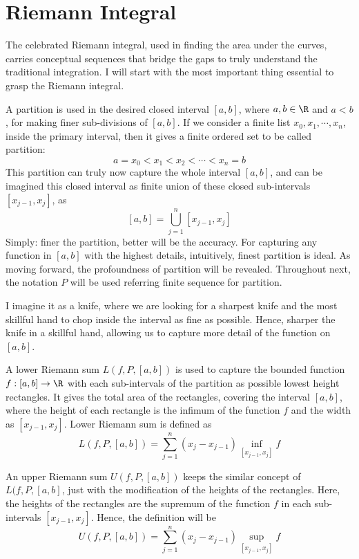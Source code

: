 \section{Riemann Integral}
The celebrated Riemann integral, used in finding the area under the curves, carries conceptual sequences that bridge the gaps to truly understand the traditional integration. I will start with the most important thing essential to grasp the Riemann integral.
\begin{concept}[Partition]
A partition is used in the desired closed interval $[a, b]$, where $a, b\in \R$ and $a<b$, for making finer sub-divisions of $[a, b]$. If we consider a finite list $x_0, x_1,\cdots ,x_n$, inside the primary interval, then it gives a finite ordered set to be called partition:
\[
a=x_0<x_1<x_2<\cdots <x_n=b
\]
This partition can truly now capture the whole interval $[a, b]$, and can be imagined this closed interval as finite union of these closed sub-intervals $[x_{j-1}, x_j]$, as
\[
[a, b] = \bigcup_{j=1}^n [x_{j-1}, x_j]
\]
Simply: finer the partition, better will be the accuracy. 
For capturing any function in $[a,b]$ with the highest details, intuitively, finest partition is ideal. As moving forward, the profoundness of partition will be revealed. Throughout next, the notation $P$ will be used referring finite sequence for partition.
\end{concept}
\begin{analogy}
    I imagine it as a knife, where we are looking for a sharpest knife and the most skillful hand to chop inside the interval as fine as possible. Hence, sharper the knife in a skillful hand, allowing us to capture more detail of the function on $[a, b]$.
\end{analogy}
\begin{definition} 
    A lower Riemann sum $L(f, P, [a, b])$ is used to capture the bounded function $f: [a, b]\to \R$ with each sub-intervals of the partition as possible lowest height rectangles. It gives the total area of the rectangles, covering the interval $[a, b]$, where the height of each rectangle is the infimum of the function $f$ and the width as $[x_{j-1}, x_j]$. Lower Riemann sum is defined as
    \[
    L(f, P, [a, b]) = \sum_{j=1}^n (x_j-x_{j-1}) \inf_{[x_{j-1}, x_j]} f
    \]
\end{definition}
\begin{definition}
    An upper Riemann sum $U(f, P, [a,b])$ keeps the similar concept of $L(f, P, [a, b]$, just with the modification of the heights of the rectangles. Here, the heights of the rectangles are the supremum of the function $f$ in each sub-intervals $[x_{j-1}, x_j]$. Hence, the definition will be
    \[
    U(f, P, [a, b]) = \sum_{j=1}^n (x_j-x_{j-1}) \sup_{[x_{j-1}, x_j]} f
    \]
\end{definition}

